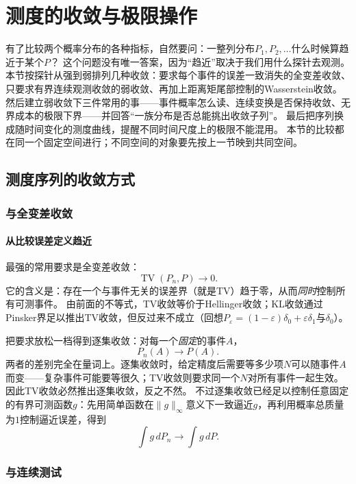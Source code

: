 \section{测度的收敛与极限操作}
\label{sec:measure-convergence}

有了比较两个概率分布的各种指标，自然要问：一整列分布$P_1,P_2,\ldots$什么时候算趋近于某个$P$？
这个问题没有唯一答案，因为“趋近”取决于我们用什么探针去观测。
本节按探针从强到弱排列几种收敛：要求每个事件的误差一致消失的全变差收敛、只要求有界连续观测收敛的弱收敛、再加上距离矩尾部控制的Wasserstein收敛。
然后建立弱收敛下三件常用的事——事件概率怎么读、连续变换是否保持收敛、无界成本的极限下界——并回答“一族分布是否总能挑出收敛子列”。
最后把序列换成随时间变化的测度曲线，提醒不同时间尺度上的极限不能混用。
本节的比较都在同一个固定空间进行；不同空间的对象要先按上一节映到共同空间。

\subsection{测度序列的收敛方式}
\label{sec:measure-sequence-convergence}

\subsubsection{与全变差收敛}

\paragraph{从比较误差定义趋近}

最强的常用要求是全变差收敛：
\[
 \operatorname{TV}(P_n,P)\to0.
\]
它的含义是：存在一个与事件无关的误差界（就是TV）趋于零，从而\emph{同时}控制所有可测事件。
由前面的不等式，TV收敛等价于Hellinger收敛；KL收敛通过Pinsker界足以推出TV收敛，但反过来不成立（回想$P_\varepsilon=(1-\varepsilon)\delta_0+\varepsilon\delta_1$与$\delta_0$）。

把要求放松一档得到逐集收敛：对每一个\emph{固定}的事件$A$，
\[
 P_n(A)\to P(A).
\]
两者的差别完全在量词上。逐集收敛时，给定精度后需要等多少项$N$可以随事件$A$而变——复杂事件可能要等很久；TV收敛则要求同一个$N$对所有事件一起生效。
因此TV收敛必然推出逐集收敛，反之不然。
不过逐集收敛已经足以控制任意固定的有界可测函数$g$：先用简单函数在$\|g\|_\infty$意义下一致逼近$g$，再利用概率总质量为$1$控制逼近误差，得到
\[
 \int g\,dP_n\to\int g\,dP.
\]

\subsubsection{与连续测试}

